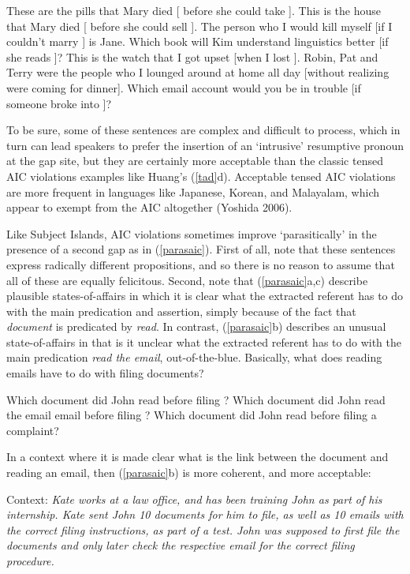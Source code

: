 \documentclass[output=paper]{langsci/langscibook}
\begin{document}
\ea \label{gr}
  \ea These are the pills that Mary died [ before she could take \spc].
   \ex This is the house that Mary died [ before she could sell \spc].
\ex  The person who I would kill myself [if I couldn't marry \spc] is Jane.
\ex Which book  will Kim understand linguistics better [if she reads \spc]?
\ex  This is the watch that I got upset [when I lost \spc].
\ex   Robin, Pat and Terry were the people who I lounged around at home
all day [without realizing were \spcs coming for dinner].
\ex Which email account would you be in trouble [if someone broke into \spc]?
\z 
\z

\noindent 
To be sure, some of these  sentences are complex and difficult to process,  
which in turn can lead speakers to prefer the insertion of an `intrusive' resumptive 
pronoun at the gap site, but they are certainly more acceptable than the 
classic tensed AIC violations examples like Huang's (\ref{tad}d).
Acceptable tensed AIC violations are more frequent in languages like Japanese, Korean,  and Malayalam, which appear to exempt from the AIC altogether (Yoshida 2006). 

Like Subject Islands, AIC violations sometimes improve `parasitically' in the presence of a second gap as in (\ref{parasaic}). First of all, note that these sentences express radically different propositions, and so there is no reason to assume that all of these are equally felicitous.
Second, note that (\ref{parasaic}a,c) describe plausible  states-of-affairs in which it is clear what the extracted referent has to do with the main predication and assertion, simply because of the fact that {\it document}  is predicated by {\it read}.  In contrast, (\ref{parasaic}b) describes an unusual state-of-affairs in that is it unclear what the extracted referent  has to do with the main predication {\it read the email}, out-of-the-blue. Basically, what does reading emails have to do with filing documents?

\ea 
\ea  Which document did John read \spcs before filing \spc? 
\ex \bad{*}Which document did John read the email email before filing \spc?
\ex Which document did John read \spcs before filing a complaint?
\z \label{parasaic}
\z

\noindent
In a context where it is made clear what is the link between the document and reading an email, then (\ref{parasaic}b) is more coherent,  and more acceptable:

\ea 
{\sc Context:} {\it Kate works at a law office, and has been training John as part of his internship. Kate sent John 10 documents for him to file, as well as 10  emails with the correct filing instructions, as part of a test. John was supposed to first file the documents and only later check the respective email for the correct filing procedure.}
\end{document}
